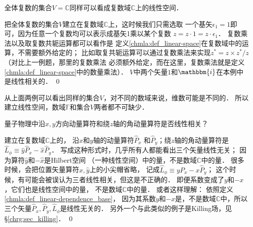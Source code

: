 \begin{example}\label{chmla:exm_rc2}
    全体复数的集合$V=\mathbb{C}$同样可以看成复数域$\mathbb{C}$上的线性空间．
\end{example}
把全体复数的集合$V$建立在复数域$\mathbb{C}$上，这时候我们只需选取
一个基矢$\epsilon_1=1$即可，因为任意一个复数均可以表示成基矢1乘以某个复数
$z=z\cdot 1=z\cdot \epsilon_1$．
复数乘法以及取复数共轭运算都可以看作是
定义\ref{chmla:def_linear-space}在复数域中的运算，不需要额外给定的；
比如取复共轭运算可以通过复数乘法来实现$z^*= z \times z^*/z$（对比上一例题，那里的复数乘法
必须额外给定，而在这里，复数乘法就是定义\ref{chmla:def_linear-space}中的数量乘法）．
$V$中两个矢量$1$和$\mathbbm{i}$在本例中是线性相关的．
\qed

从上面两例可以看出同样的集合$V$，对不同的数域来说，维数可能是不同的．
所以建立线性空间，数域$\mathbb{F}$和集合$V$两者都不可缺少．




\begin{example}
    量子物理中沿$x,y$方向动量算符和绕$z$轴的角动量算符是否线性相关？
\end{example}
建立在复数域$\mathbb{C}$上的，
沿$x$和$y$轴的动量算符$\hat{P}_x$
和$\hat{P}_y$；绕$z$轴的角动量算符是
$\hat{L}_\phi \equiv \hat{y}\hat{P}_x - \hat{x} \hat{P}_y$．
写成这种形式时，几乎所有人都能看出三个矢量线性无关；
因为算符$\hat{y}$和$-\hat{x}$是Hilbert空间
（一种线性空间）中的量，不是数域$\mathbb{C}$中的量．
很多时候，会把位置矢量算符$\hat{x},\hat{y}$上的小尖帽省略，
记成$\hat{L}_\phi \equiv {y}\hat{P}_x - {x} \hat{P}_y$；
这个时候，有可能会被误认为三者线性相关，但这是不正确的．
即便系数变成了$y$和$-x$，它们也是线性空间中的量，
不是数域$\mathbb{C}$中的量．
或者这样理解：
依照定义\ref{chmla:def_linear-dependence_base}，
因为其系数$y$和$-x$是{}，不是数域$\mathbb{C}$中{}，所以
三个矢量$\hat{P}_x, \hat{P}_y, \hat{L}_\phi$是线性无关的．
另外一个与此类似的例子是Killing场，见\S \ref{chrg:sec_killing}．
\qed

